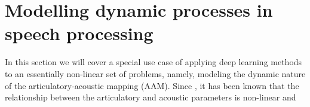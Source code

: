 \documentclass{article}
\begin{document}
\section{Modelling dynamic processes in speech processing}
In this section we will cover a special use case of applying deep learning methods to an essentially non-linear set of problems, namely, modeling the dynamic nature of the articulatory-acoustic mapping (AAM). Since \cite{stevens1968}, it has been known that the relationship between the articulatory and acoustic parameters is non-linear and 


\end{document}
